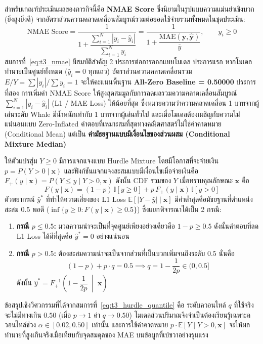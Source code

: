 สำหรับเกณฑ์ประเมินผลของภารกิจนี้คือ \textbf{NMAE Score} ซึ่งนิยามในรูปแบบความแม่นยำเชิงบวก (ยิ่งสูงยิ่งดี) จากอัตราส่วนความคลาดเคลื่อนสัมบูรณ์รวมต่อยอดใช้จ่ายรวมทั้งหมดในชุดประเมิน:
\begin{equation}
\label{eq:t3_nmae}
\text{NMAE Score} = \frac{1}{1 + \dfrac{\sum_{i=1}^{N} |y_i - \hat{y}_i|}{\sum_{i=1}^{N} y_i}} = \frac{1}{1 + \dfrac{\text{MAE}(\mathbf{y}, \hat{\mathbf{y}})}{\bar{y}}}, \qquad y_i \ge 0
\end{equation}
สมการที่~\eqref{eq:t3_nmae} มีสมบัติสำคัญ 2 ประการต่อการออกแบบโมเดล ประการแรก หากโมเดลทำนายเป็นศูนย์ทั้งหมด ($\hat{y}_i = 0$ ทุกแถว) อัตราส่วนความคลาดเคลื่อนรวม $E / Y = \sum |y_i| / \sum y_i = 1$ จะให้คะแนนพื้นฐาน \textbf{All-Zero Baseline = 0.50000} ประการที่สอง การเพิ่มค่า $\text{NMAE Score}$ ให้สูงสุดสมมูลกับการลดผลรวมความคลาดเคลื่อนสัมบูรณ์ $\sum_{i=1}^N |y_i - \hat{y}_i|$ (L1 / MAE Loss) ให้น้อยที่สุด ซึ่งหมายความว่าความคลาดเคลื่อน 1 บาทจากผู้เล่นระดับ Whale มีน้ำหนักเท่ากับ 1 บาทจากผู้เล่นทั่วไป และเมื่อโมเดลต้องเผชิญกับความไม่แน่นอนแบบ Zero-Inflated คำตอบที่เหมาะสมที่สุดทางคณิตศาสตร์ไม่ใช่ค่าคาดหมาย (Conditional Mean) แต่เป็น \textbf{ค่ามัธยฐานแบบมีเงื่อนไขของส่วนผสม (Conditional Mixture Median)}

\begin{insightbox}
ให้ตัวแปรสุ่ม $Y \ge 0$ มีการแจกแจงแบบ Hurdle Mixture โดยมีโอกาสที่จะจ่ายเงิน $p = P(Y > 0 \mid \mathbf{x})$ และฟังก์ชันแจกแจงสะสมแบบมีเงื่อนไขเมื่อจ่ายเงินคือ $F_+(y \mid \mathbf{x}) = P(Y \le y \mid Y > 0, \mathbf{x})$ ดังนั้น CDF รวมของ $Y$ เมื่อทราบคุณลักษณะ $\mathbf{x}$ คือ
\[
F(y \mid \mathbf{x}) = (1 - p)\,\mathbb{I}[y \ge 0] + p\,F_+(y \mid \mathbf{x})\,\mathbb{I}[y > 0]
\]
ตัวพยากรณ์ $\hat{y}^*$ ที่ทำให้ความเสี่ยงของ L1 Loss $\mathbb{E}[|Y - \hat{y}| \mid \mathbf{x}]$ มีค่าต่ำสุดคือมัธยฐานที่ตำแหน่งสะสม $0.5$ พอดี ($\inf\{y \ge 0 : F(y \mid \mathbf{x}) \ge 0.5\}$) ซึ่งแยกพิจารณาได้เป็น 2 กรณี:
\begin{enumerate}
    \item \textbf{กรณี $p \le 0.5$:} มวลความน่าจะเป็นที่จุดศูนย์เพียงอย่างเดียวคือ $1 - p \ge 0.5$ ดังนั้นคำตอบที่ลด L1 Loss ได้ดีที่สุดคือ \textbf{$\hat{y}^* = 0$} อย่างแน่นอน
    \item \textbf{กรณี $p > 0.5$:} ต้องสะสมความน่าจะเป็นจากส่วนที่เป็นบวกเพิ่มจนถึงระดับ $0.5$ นั่นคือ
    \begin{equation}
    \label{eq:t3_hurdle_quantile}
    (1 - p) + p \cdot q = 0.5 \implies q = 1 - \frac{1}{2p} \in (0, 0.5]
    \end{equation}
    ดังนั้น $\hat{y}^* = F_+^{-1}\!\left(1 - \dfrac{1}{2p} \;\middle|\; \mathbf{x}\right)$
\end{enumerate}
ข้อสรุปเชิงวิศวกรรมที่ได้จากสมการที่~\eqref{eq:t3_hurdle_quantile} คือ ระดับควอนไทล์ $q$ ที่ใช้จริงจะไม่มีทางเกิน $0.50$ (เมื่อ $p \to 1$ ค่า $q \to 0.50$) โมเดลส่วนปริมาณจึงจำเป็นต้องเรียนรู้เฉพาะควอนไทล์ช่วง $\alpha \in [0.02, 0.50]$ เท่านั้น และการใช้ค่าคาดหมาย $p \cdot \mathbb{E}[Y \mid Y > 0, \mathbf{x}]$ จะให้ผลทำนายที่สูงเกินจริงเมื่อเทียบกับจุดสมดุลของ MAE บนข้อมูลที่เบ้ขวาอย่างรุนแรง
\end{insightbox}

